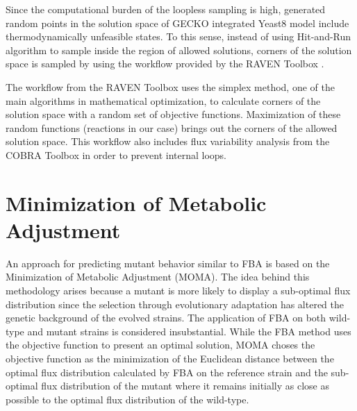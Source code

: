 Since the computational burden of the loopless sampling is high, generated random points in the solution space of GECKO integrated Yeast8 model include thermodynamically unfeasible states. To this sense, instead of using Hit-and-Run algorithm to sample inside the region of allowed solutions, corners of the solution space is sampled by using the workflow provided by the RAVEN Toolbox \cite{wang2018raven}.

The workflow from the RAVEN Toolbox uses the simplex method, one of the main algorithms in mathematical optimization, to calculate corners of the solution space with a random set of objective functions. Maximization of these random functions (reactions in our case) brings out the corners of the allowed solution space. This workflow also includes flux variability analysis from the COBRA Toolbox in order to prevent internal loops.

\section{Minimization of Metabolic Adjustment}
An approach for predicting mutant behavior similar to FBA is based on the Minimization of Metabolic Adjustment (MOMA). The idea behind this methodology arises because a mutant is more likely to display a sub-optimal flux distribution since the selection through evolutionary adaptation has altered the genetic background of the evolved strains. The application of FBA on both wild-type and mutant strains is considered insubstantial. While the FBA method uses the objective function to present an optimal solution, MOMA choses the objective function as the minimization of the Euclidean distance between the optimal flux distribution calculated by FBA on the reference strain and the sub-optimal flux distribution of the mutant where it remains initially as close as possible to the optimal flux distribution of the wild-type.

